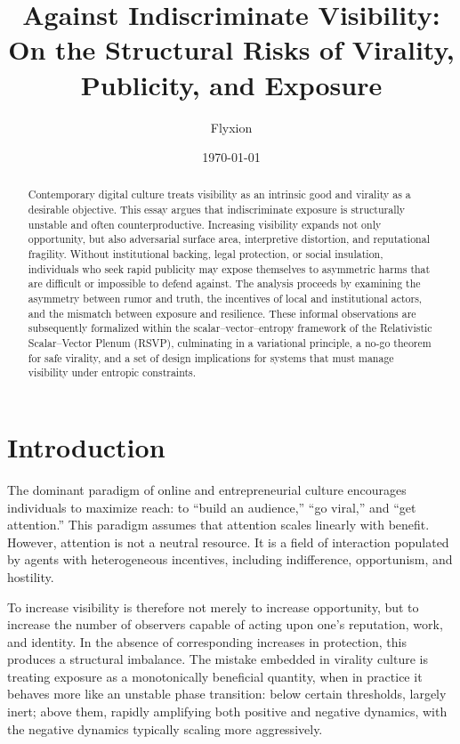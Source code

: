 \documentclass[12pt,a4paper]{article}
\title{Against Indiscriminate Visibility:\\
On the Structural Risks of Virality, Publicity, and Exposure}
\author{Flyxion}
\date{\today}
\begin{document}
\maketitle

\begin{abstract}
Contemporary digital culture treats visibility as an intrinsic good and virality as a desirable objective. This essay argues that indiscriminate exposure is structurally unstable and often counterproductive. Increasing visibility expands not only opportunity, but also adversarial surface area, interpretive distortion, and reputational fragility. Without institutional backing, legal protection, or social insulation, individuals who seek rapid publicity may expose themselves to asymmetric harms that are difficult or impossible to defend against. The analysis proceeds by examining the asymmetry between rumor and truth, the incentives of local and institutional actors, and the mismatch between exposure and resilience. These informal observations are subsequently formalized within the scalar--vector--entropy framework of the Relativistic Scalar--Vector Plenum (RSVP), culminating in a variational principle, a no-go theorem for safe virality, and a set of design implications for systems that must manage visibility under entropic constraints.
\end{abstract}

\newpage

\section{Introduction}

The dominant paradigm of online and entrepreneurial culture encourages individuals to maximize reach: to ``build an audience,'' ``go viral,'' and ``get attention.'' This paradigm assumes that attention scales linearly with benefit. However, attention is not a neutral resource. It is a field of interaction populated by agents with heterogeneous incentives, including indifference, opportunism, and hostility.

To increase visibility is therefore not merely to increase opportunity, but to increase the number of observers capable of acting upon one's reputation, work, and identity. In the absence of corresponding increases in protection, this produces a structural imbalance. The mistake embedded in virality culture is treating exposure as a monotonically beneficial quantity, when in practice it behaves more like an unstable phase transition: below certain thresholds, largely inert; above them, rapidly amplifying both positive and negative dynamics, with the negative dynamics typically scaling more aggressively.
\end{document}
